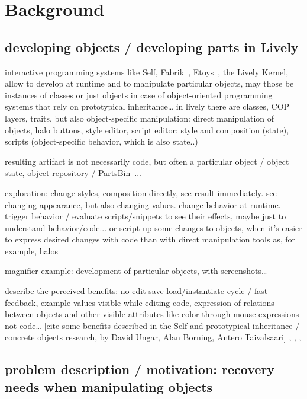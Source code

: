 \chapter{Background} \label{sec:BACKGROUND}




\section{developing objects / developing parts in Lively}

interactive programming systems like Self, Fabrik~\cite{Ingalls1988FVP}, Etoys~\cite{Kay2005Etoys}, the Lively Kernel, allow to develop at runtime and to manipulate particular objects, may those be instances of classes or just objects in case of object-oriented programming systems that rely on prototypical inheritance… in lively there are classes, COP layers, traits, but also object-specific manipulation:
direct manipulation of objects, halo buttons, style editor, script editor: style and composition (state), scripts (object-specific behavior, which is also state..)

resulting artifact is not necessarily code, but often a particular object / object state, object repository / PartsBin~\cite{Lincke2012LPC}...

exploration: change styles, composition directly, see result immediately. see changing appearance, but also changing values. change behavior at runtime. trigger behavior / evaluate scripts/snippets to see their effects, maybe just to understand behavior/code... or script-up some changes to objects, when it’s easier to express desired changes with code than with direct manipulation tools as, for example, halos

magnifier example: development of particular objects, with screenshots…

describe the perceived benefits: no edit-save-load/instantiate cycle / fast feedback, example values visible while editing code, expression of relations between objects and other visible attributes like color through mouse expressions not code… 
[cite some benefits described in the Self and prototypical inheritance / concrete objects research, by David Ungar, Alan Borning, Antero Taivalsaari]
\cite{Taivalsaari1996CVP}, \cite{Tailvalsaari1992Kevo}, \cite{Borning1986CVP}, \cite{Taivalsaari97CVP}


\section{problem description / motivation: recovery needs when manipulating objects}

